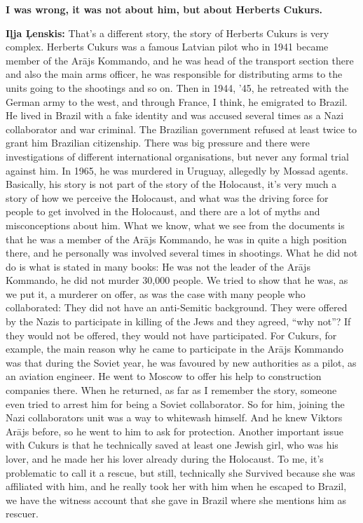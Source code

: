 \textbf{I was wrong, it was not about him, but about Herberts Cukurs.} 

\textbf{Iļja Ļenskis:} That’s a different story, the story of Herberts Cukurs is very complex. Herberts Cukurs was a famous Latvian pilot who in 1941 became member of the Arājs Kommando, and he was head of the transport section there and also the main arms officer, he was responsible for distributing arms to the units going to the shootings and so on. Then in 1944, '45, he retreated with the German army to the west, and through France, I think, he emigrated to Brazil. He lived in Brazil with a fake identity and was accused several times as a Nazi collaborator and war criminal. The Brazilian government refused at least twice to grant him Brazilian citizenship. There was big pressure and there were investigations of different international organisations, but never any formal trial against him. In 1965, he was murdered in Uruguay, allegedly by Mossad agents. Basically, his story is not part of the story of the Holocaust, it’s very much a story of how we perceive the Holocaust, and what was the driving force for people to get involved in the Holocaust, and there are a lot of myths and misconceptions about him. What we know, what we see from the documents is that he was a member of the Arājs Kommando, he was in quite a high position there, and he personally was involved several times in shootings. What he did not do is what is stated in many books: He was not the leader of the Arājs Kommando, he did not murder 30,000 people. We tried to show that he was, as we put it, a murderer on offer, as was the case with many people who collaborated: They did not have an anti-Semitic background. They were offered by the Nazis to participate in killing of the Jews and they agreed, ``why not''? If they would not be offered, they would not have participated. For Cukurs, for example, the main reason why he came to participate in the Arājs Kommando was that during the Soviet year, he was favoured by new authorities as a pilot, as an aviation engineer. He went to Moscow to offer his help to construction companies there. When he returned, as far as I remember the story, someone even tried to arrest him for being a Soviet collaborator. So for him, joining the Nazi collaborators unit was a way to whitewash himself. And he knew Viktors Arājs before, so he went to him to ask for protection. Another important issue with Cukurs is that he technically saved at least one Jewish girl, who was his lover, and he made her his lover already during the Holocaust. To me, it’s problematic to call it a rescue, but still, technically she Survived because she was affiliated with him, and he really took her with him when he escaped to Brazil, we have the witness account that she gave in Brazil where she mentions him as rescuer. \\
